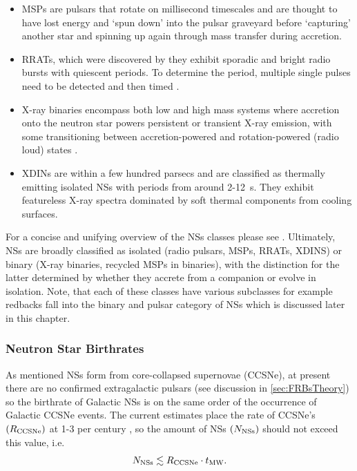 \begin{itemize}[label={}]
  \item MSPs are pulsars that rotate on millisecond timescales and are thought to have lost energy and `spun down' into the pulsar graveyard before `capturing' another star and spinning up again through mass transfer during accretion.

  \item RRATs, which were discovered by \cite{McLaughlin:2006p6248} they exhibit sporadic and bright radio bursts with quiescent periods. To determine the period, multiple single pulses need to be detected and then timed \citep{Keane:2011p10822}.

  \item X-ray binaries encompass both low and high mass systems where accretion onto the neutron star powers persistent or transient X-ray emission, with some transitioning between accretion-powered and rotation-powered (radio loud) states \citep{lorimer_binary_2008}.

  \item  XDINs are within a few hundred parsecs and are classified as thermally emitting isolated NSs with periods from around 2-12~s. They exhibit featureless X-ray spectra dominated by soft thermal components from cooling surfaces.
  
\end{itemize}

For a concise and unifying overview of the NSs classes please see \cite{kaspi_grand_2010}. Ultimately, NSs are broadly classified as isolated (radio pulsars, MSPs, RRATs, XDINS) or binary (X-ray binaries, recycled MSPs in binaries), with the distinction for the latter determined by whether they accrete from a companion or evolve in isolation. Note, that each of these classes have various subclasses for example redbacks fall into the binary and pulsar category of NSs which is discussed later in this chapter.  

\subsubsection{Neutron Star Birthrates}

As mentioned NSs form from core-collapsed supernovae (CCSNe), at present there are no confirmed extragalactic pulsars (see discussion in \cref{sec:FRBsTheory}) so the birthrate of Galactic NSs is on the same order of the occurrence of Galactic CCSNe events. The current estimates place the rate of CCSNe's $(R_{\rm{CCSNe}})$ at 1-3 per century \citep{rozwadowska_rate_2021}, so the amount of NSs $(N_{\rm{NSs}})$ should not exceed this value, i.e.
\begin{equation}
 N_{\rm{NSs}} \lesssim R_{\rm{CCSNe}} \cdot t_{\rm{MW}}.
\end{equation}

